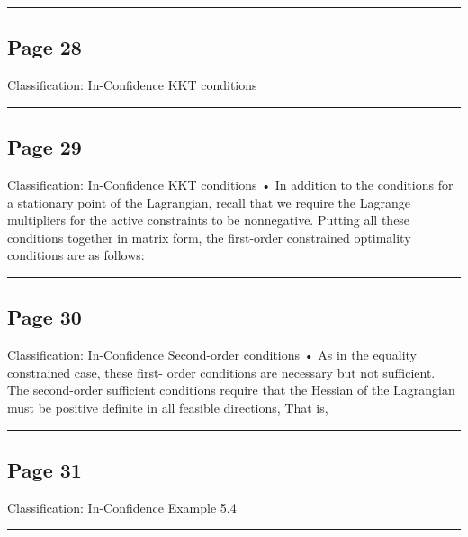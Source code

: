 \documentclass[
]{article}
\begin{document}
\begin{center}\rule{0.5\linewidth}{0.5pt}\end{center}

\subsection{Page 28}\label{page-28}

Classification: In-Confidence KKT conditions

\begin{center}\rule{0.5\linewidth}{0.5pt}\end{center}

\subsection{Page 29}\label{page-29}

Classification: In-Confidence KKT conditions • In addition to the
conditions for a stationary point of the Lagrangian, recall that we
require the Lagrange multipliers for the active constraints to be
nonnegative. Putting all these conditions together in matrix form, the
first-order constrained optimality conditions are as follows:

\begin{center}\rule{0.5\linewidth}{0.5pt}\end{center}

\subsection{Page 30}\label{page-30}

Classification: In-Confidence Second-order conditions • As in the
equality constrained case, these first- order conditions are necessary
but not sufficient. The second-order sufficient conditions require that
the Hessian of the Lagrangian must be positive definite in all feasible
directions, That is,

\begin{center}\rule{0.5\linewidth}{0.5pt}\end{center}

\subsection{Page 31}\label{page-31}

Classification: In-Confidence Example 5.4

\begin{center}\rule{0.5\linewidth}{0.5pt}\end{center}
\end{document}

